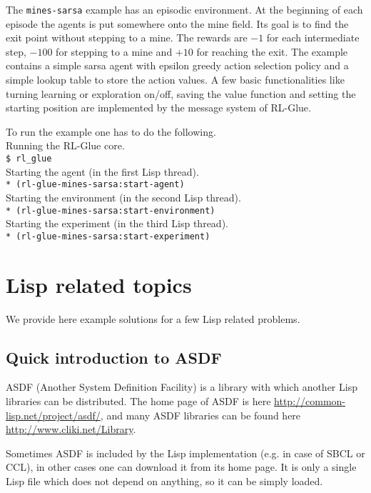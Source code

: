 \documentclass[11pt,a4paper,dvipdfm]{article}
\newcommand{\selfref}[1]{\href{#1}{#1}}
\newcommand{\prompttext}[1]{\texttt{#1}}
\newcommand{\shprompt}[1]{\prompttext{\$ #1}}
\newcommand{\lispprompt}[1]{\prompttext{* #1}}
\begin{document}
The \prompttext{mines-sarsa} example has an episodic environment. At the
beginning of each episode the agents is put somewhere onto the mine field.
Its goal is to find the exit point without stepping to a mine. The rewards
are $-1$ for each intermediate step, $-100$ for stepping to a mine and $+10$
for reaching the exit. The example contains a simple sarsa agent with epsilon
greedy action selection policy and a simple lookup table to store the action
values. A few basic functionalities like turning learning or exploration
on/off, saving the value function and setting the starting position are
implemented by the message system of RL-Glue.

To run the example one has to do the following. \\
Running the RL-Glue core. \\
\shprompt{rl\_glue} \\
Starting the agent (in the first Lisp thread). \\
\lispprompt{(rl-glue-mines-sarsa:start-agent)} \\
Starting the environment (in the second Lisp thread). \\
\lispprompt{(rl-glue-mines-sarsa:start-environment)} \\
Starting the experiment (in the third Lisp thread). \\
\lispprompt{(rl-glue-mines-sarsa:start-experiment)}

\section{Lisp related topics}

We provide here example solutions for a few Lisp related problems.

\hypertarget{asdfintro}{\subsection{Quick introduction to ASDF}}

ASDF (Another System Definition Facility) is a library with which another
Lisp libraries can be distributed. The home page of ASDF is here
\selfref{http://common-lisp.net/project/asdf/}, and many ASDF libraries can
be found here \selfref{http://www.cliki.net/Library}.

Sometimes ASDF is included by the Lisp implementation (e.g. in case of SBCL
or CCL), in other cases one can download it from its home page. It is only a
single Lisp file which does not depend on anything, so it can be simply loaded.
\end{document}
